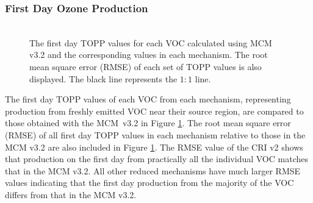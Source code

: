 \subsubsection{First Day Ozone Production} \label{sss:day1} %
%
\begin{figure}
    \centering
    \includegraphics[width=\textwidth]{img/first_day_values}
    \vspace{1mm}
    \caption{The first day TOPP values for each VOC calculated using MCM v3.2 and the corresponding values in each mechanism. The root mean square error (RMSE) of each set of TOPP values is also displayed. The black line represents the $1:1$ line.}
    \vspace{-4mm}
    \label{f:first_day}
\end{figure}
%
The first day TOPP values of each VOC from each mechanism, representing  production from freshly emitted VOC near their source region, are compared to those obtained with the \mbox{MCM v3.{2}} in Figure \ref{f:first_day}.
The root mean square error (RMSE) of all first day TOPP values in each mechanism relative to those in the MCM v3.2 are also included in Figure \ref{f:first_day}.  
The RMSE value of the CRI v2 shows that  production on the first day from practically all the individual VOC matches that in the MCM v3.2.
All other reduced mechanisms have much larger RMSE values indicating that the first day  production from the majority of the VOC differs from that in the MCM v3.2.

